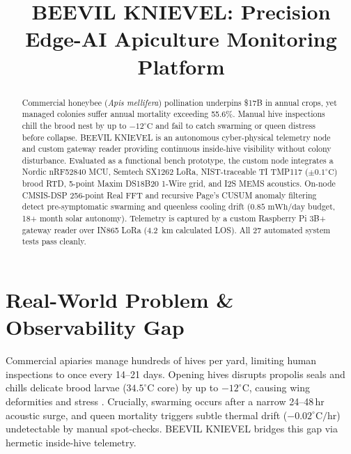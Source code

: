 \documentclass[10pt,conference,letterpaper]{IEEEtran}
\begin{document}
\title{\LARGE BEEVIL KNIEVEL: Precision Edge-AI Apiculture Monitoring Platform}

\author{
}

\maketitle

\begin{abstract}
Commercial honeybee (\textit{Apis mellifera}) pollination underpins \$17B in annual crops, yet managed colonies suffer annual mortality exceeding 55.6\%. Manual hive inspections chill the brood nest by up to $-12^\circ\text{C}$ and fail to catch swarming or queen distress before collapse. BEEVIL KNIEVEL is an autonomous cyber-physical telemetry node and custom gateway reader providing continuous inside-hive visibility without colony disturbance. Evaluated as a functional bench prototype, the custom node integrates a Nordic nRF52840 MCU, Semtech SX1262 LoRa, NIST-traceable TI TMP117 ($\pm 0.1^\circ\text{C}$) brood RTD, 5-point Maxim DS18B20 1-Wire grid, and I2S MEMS acoustics. On-node CMSIS-DSP 256-point Real FFT and recursive Page's CUSUM anomaly filtering detect pre-symptomatic swarming and queenless cooling drift ($0.85\text{ mWh/day}$ budget, 18+ month solar autonomy). Telemetry is captured by a custom Raspberry Pi 3B+ gateway reader over IN865 LoRa (4.2~km calculated LOS). All 27 automated system tests pass cleanly.
\end{abstract}

\section{Real-World Problem \& Observability Gap}
Commercial apiaries manage hundreds of hives per yard, limiting human inspections to once every 14--21 days. Opening hives disrupts propolis seals and chills delicate brood larvae ($34.5^\circ\text{C}$ core) by up to $-12^\circ\text{C}$, causing wing deformities and stress \cite{ferrari2008}. Crucially, swarming occurs after a narrow 24--48\,hr acoustic surge, and queen mortality triggers subtle thermal drift ($-0.02^\circ\text{C}/\text{hr}$) undetectable by manual spot-checks. BEEVIL KNIEVEL bridges this gap via hermetic inside-hive telemetry.
\end{document}
